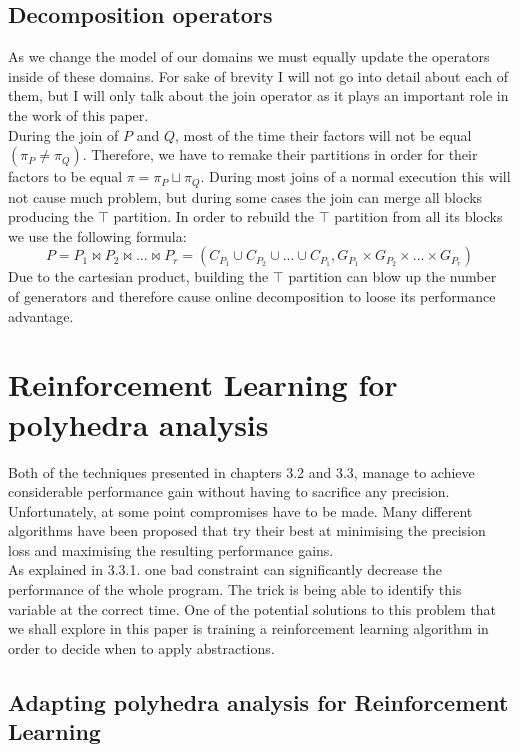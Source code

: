 \subsection{Decomposition operators}
As we change the model of our domains we must equally update the operators inside of these domains. For sake of brevity I will not go into detail about each of them, but I will only talk about the join operator as it plays an important role in the work of this paper.\\
During the join of $P$ and $Q$, most of the time their factors will not be equal$(\pi_P \neq \pi_Q)$. Therefore, we have to remake their partitions in order for their factors to be equal $\pi = \pi_P\sqcup\pi_Q$. During most joins of a normal execution this will not cause much problem, but during some cases the join can merge all blocks producing the $\top$ partition. In order to rebuild the $\top$ partition from all its blocks we use the following formula:
\begin{equation}
	P = P_1 \Join P_2 \Join ... \Join P_r = (C_{P_1} \cup C_{P_2} \cup ... \cup C_{P_1}, G_{P_1} \times G_{P_2} \times  ... \times   G_{P_r})
\end{equation}
Due to the cartesian product, building the $\top$ partition can blow up the number of generators and therefore cause online decomposition to loose its performance advantage.

\section{Reinforcement Learning for polyhedra analysis}
Both of the techniques presented in chapters 3.2 and 3.3, manage to achieve considerable performance gain without having to sacrifice any precision. Unfortunately, at some point compromises have to be made. Many different algorithms have been proposed that try their best at minimising the precision loss and maximising the resulting performance gains. \\
As explained in 3.3.1. one bad constraint can significantly decrease the performance of the whole program. The trick is being able to identify this variable at the correct time. One of the potential solutions to this problem that we shall explore in this paper is training a reinforcement learning algorithm in order to decide when to apply abstractions.

\subsection{Adapting polyhedra analysis for Reinforcement Learning}

